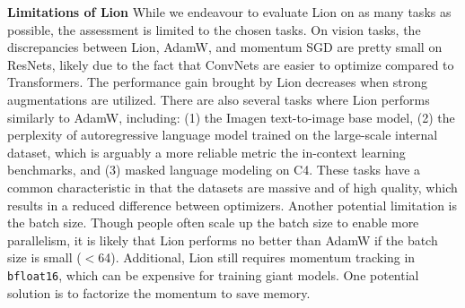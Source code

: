 \documentclass{article}
\newcommand{\name}{Lion}
\begin{document}
\textbf{Limitations of \name{}}
While we endeavour to evaluate \name{} on as many tasks as possible, the assessment is limited to the chosen tasks.
On vision tasks, the discrepancies between \name{}, AdamW, and momentum SGD are pretty small on ResNets, likely due to the fact that ConvNets are easier to optimize compared to Transformers. 
The performance gain brought by \name{} decreases when strong augmentations are utilized.
There are also several tasks where \name{} performs similarly to AdamW, including: (1) the Imagen text-to-image base model, (2) the perplexity of autoregressive language model trained on the large-scale internal dataset, which is arguably a more reliable metric the in-context learning benchmarks, and (3) masked language modeling on C4.
These tasks have a common characteristic in that the datasets are massive and of high quality, which results in a reduced difference between optimizers.
Another potential limitation is the batch size. Though people often scale up the batch size to enable more parallelism, it is likely that \name{} performs no better than AdamW if the batch size is small ($<$64).
Additional, \name{} still requires momentum tracking in \texttt{bfloat16}, which can be expensive for training giant models.
One potential solution is to factorize the momentum to save memory.


\end{document}
